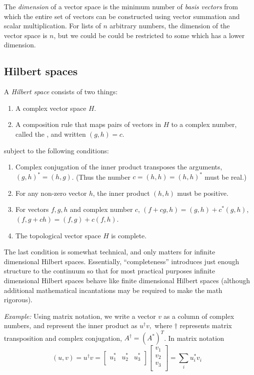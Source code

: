 The {\sl dimension} of a vector space is the minimum number of {\sl basis vectors} from which the entire set of vectors can be constructed using vector summation and scalar multiplication. For lists of $n$ arbitrary numbers, the dimension of the vector space is $n$, but we could be could be restricted to some  which has a lower dimension.



\subsection{Hilbert spaces}

A {\sl Hilbert space} consists of two things:

 \begin{enumerate}
 \item A complex vector space $H$.
 \item A composition rule that maps pairs of vectors in $H$ to a complex number, called the , and written $(g,h)=c$.
 \end{enumerate}
 subject to the following conditions:
 \begin{enumerate}
 \item Complex conjugation of the inner product transposes the arguments, $(g, h)^* = (h, g)$. (Thus the number $c=(h,h)=(h,h)^*$ must be real.)
 \item For any non-zero vector $h$, the inner product $(h,h)$ must be positive. 
 \item For vectors $f,g,h$ and complex number $c$, $(f+cg,h) = (g,h)+ c^*(g,h)$, $(f, g+ch) = (f,g)+ c(f,h)$.
 \item The topological vector space $H$ is complete.
 \end{enumerate}
The last condition is somewhat technical, and only matters for infinite dimensional Hilbert spaces. Essentially, ``completeness'' introduces just enough structure to the continuum so that for most practical purposes infinite dimensional Hilbert spaces behave like finite dimensional Hilbert spaces (although additional mathematical incantations may be required to make the math rigorous).

{\sl Example:} Using matrix notation, we write a vector $v$ as a column of complex numbers, and represent the inner product as $u^\dagger v,$ where $\dagger$ represents  matrix transposition and complex conjugation, $A^{\dagger} = (A^*)^T$. In matrix notation
\[
(u, v) = 
u^\dagger v = 
\begin{bmatrix}
u^*_1 & u^*_2 & u^*_3\\
\end{bmatrix}
\begin{bmatrix}
v_1 \\ v_2 \\ v_3\\
\end{bmatrix}
= \sum_i u^*_i v_i
\]

